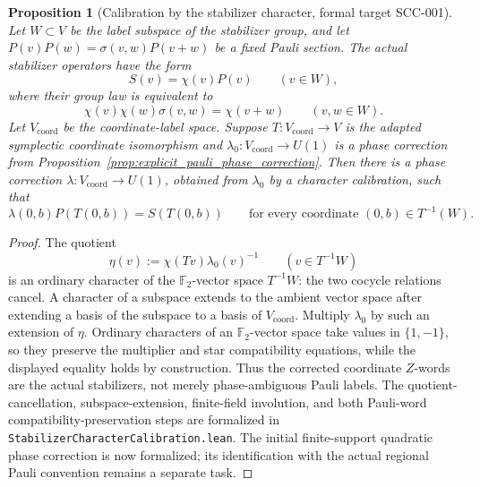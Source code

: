 \documentclass{article}
\newtheorem{proposition}[definition]{Proposition}
\begin{document}
\begin{proposition}[Calibration by the stabilizer character, formal target SCC-001]
\label{prop:stabilizer_character_calibration}
Let $W\subset V$ be the label subspace of the stabilizer group, and let
$P(v)P(w)=\sigma(v,w)P(v+w)$ be a fixed Pauli section.  The actual stabilizer
operators have the form
\begin{equation*}
  S(v)=\chi(v)P(v)\qquad (v\in W),
\end{equation*}
where their group law is equivalent to
\begin{equation*}
  \chi(v)\chi(w)\sigma(v,w)=\chi(v+w)
  \qquad (v,w\in W).
\end{equation*}
Let $V_{\mathrm{coord}}$ be the coordinate-label space.  Suppose
$T:V_{\mathrm{coord}}\to V$ is the adapted symplectic coordinate isomorphism
and $\lambda_0:V_{\mathrm{coord}}\to U(1)$ is a phase correction from
Proposition~\ref{prop:explicit_pauli_phase_correction}.  Then there is a
phase correction $\lambda:V_{\mathrm{coord}}\to U(1)$, obtained from
$\lambda_0$ by a character calibration, such that
\begin{equation*}
  \lambda(0,b)P(T(0,b))=S(T(0,b))
  \qquad\text{for every coordinate }(0,b)\in T^{-1}(W).
\end{equation*}
\end{proposition}

\begin{proof}
The quotient
\begin{equation*}
  \eta(v):=\chi(Tv)\lambda_0(v)^{-1}\qquad (v\in T^{-1}W)
\end{equation*}
is an ordinary character of the $\mathbb F_2$-vector space $T^{-1}W$:
the two cocycle relations cancel.  A character of a subspace extends to the
ambient vector space after extending a basis of the subspace to a basis of
$V_{\mathrm{coord}}$.  Multiply $\lambda_0$ by such an extension of $\eta$.  Ordinary
characters of an $\mathbb F_2$-vector space take values in $\{1,-1\}$, so they
preserve the multiplier and star compatibility equations, while
the displayed equality holds by construction.  Thus the corrected coordinate
$Z$-words are the actual stabilizers, not merely phase-ambiguous Pauli labels.
The quotient-cancellation, subspace-extension, finite-field involution, and
both Pauli-word compatibility-preservation steps are formalized in
\texttt{StabilizerCharacterCalibration.lean}.  The initial finite-support
quadratic phase correction is now formalized; its identification with the
actual regional Pauli convention remains a separate task.
\end{proof}
\end{document}

